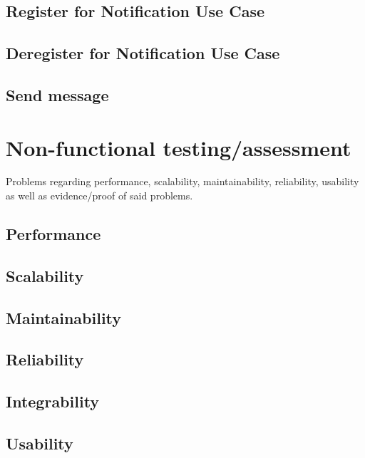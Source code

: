 \documentclass[a4paper,12pt,titlepage]{article}
\begin{document}
\subsection{Register for Notification Use Case}
	
	
\subsection{Deregister for Notification Use Case}
	
	
\subsection{Send message}
	

\newpage

\section{Non-functional testing/assessment}
Problems regarding performance, scalability, maintainability, reliability, usability as well as evidence/proof of said problems.

\subsection{Performance}
	
	
\subsection{Scalability}
	
	
\subsection{Maintainability}
	
	
\subsection{Reliability}
	

\subsection{Integrability}
	
	
\subsection{Usability}
	
	
\end{document}

